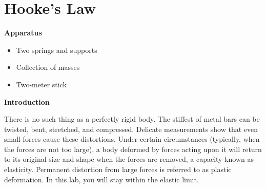 \section{Hooke's Law}


\makelabheader %

\bigskip
\textbf{Apparatus}
\begin{itemize}[nosep]
\item Two springs and supports 
\item Collection of masses 
\item Two-meter stick
\end{itemize}

\bigskip
\textbf{Introduction}

There is no such thing as a perfectly rigid body. The stiffest of metal bars can be twisted, bent, stretched, and compressed. Delicate measurements show that even small forces cause these distortions. Under certain circumstances (typically, when the forces are not too large), a body deformed by forces acting upon it will return to its original size and shape when the forces are removed, a capacity known as elasticity. Permanent distortion from large forces is referred to as plastic deformation. In this lab, you will stay within the elastic limit.



